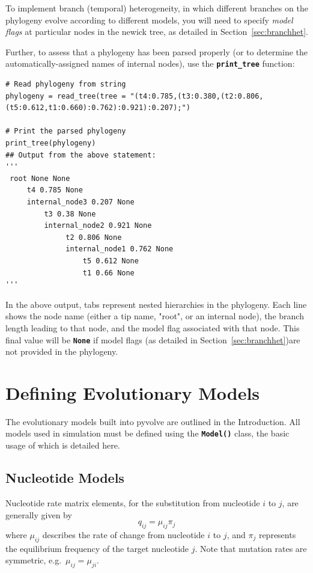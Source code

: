 \documentclass{article}
\newcommand{\code}[1]{\textbf{\texttt{\small{#1}}}}
\begin{document}
To implement branch (temporal) heterogeneity, in which different branches on the phylogeny evolve according to different models, you will need to specify \emph{model flags} at particular nodes in the newick tree, as detailed in Section~\ref{sec:branchhet}.

Further, to assess that a phylogeny has been parsed properly (or to determine the automatically-assigned names of internal nodes), use the \code{print\_tree} function:
\begin{lstlisting}
# Read phylogeny from string
phylogeny = read_tree(tree = "(t4:0.785,(t3:0.380,(t2:0.806,(t5:0.612,t1:0.660):0.762):0.921):0.207);")

# Print the parsed phylogeny
print_tree(phylogeny)
## Output from the above statement:
'''
 root None None
     t4 0.785 None
     internal_node3 0.207 None
         t3 0.38 None
         internal_node2 0.921 None
              t2 0.806 None
              internal_node1 0.762 None
                  t5 0.612 None
                  t1 0.66 None
'''
\end{lstlisting}
In the above output, tabs represent nested hierarchies in the phylogeny. Each line shows the node name (either a tip name, "root", or an internal node), the branch length leading to that node, and the model flag associated with that node. This final value will be \code{None} if model flags (as detailed in Section~\ref{sec:branchhet})are not provided in the phylogeny.



\section{Defining Evolutionary Models}\label{sec:evomodels}

The evolutionary models built into pyvolve are outlined in the Introduction. All models used in simulation must be defined using the \code{Model()} class, the basic usage of which is detailed here.

\subsection{Nucleotide Models}\label{sec:nucleotide_basic}

Nucleotide rate matrix elements, for the substitution from nucleotide $i$ to $j$, are generally given by 
\begin{equation}
q_{ij} = \mu_{ij} \pi_j
\end{equation}
where $\mu_{ij}$ describes the rate of change from nucleotide $i$ to $j$, and $\pi_j$ represents the equilibrium frequency of the target nucleotide $j$. Note that mutation rates are symmetric, e.g.\ $\mu_{ij} = \mu_{ji}$. 
\end{document}
